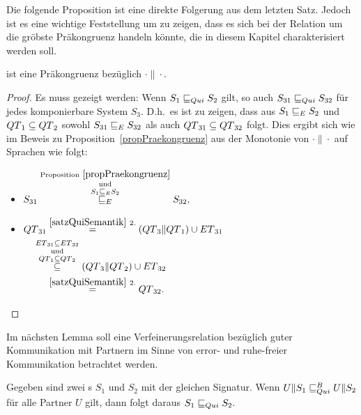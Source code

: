 Die folgende Proposition ist eine direkte Folgerung aus dem letzten Satz.
Jedoch ist es eine wichtige Feststellung um zu zeigen, dass es sich bei der
Relation \QRel{} um die gröbste Präkongruenz handeln könnte, die in diesem
Kapitel charakterisiert werden soll.

\begin{prop}
\label{propQuiPrae}
  \QRel{} ist eine Präkongruenz bezüglich $\cdot\|\cdot$.
\end{prop}

\begin{proof}
  Es muss gezeigt werden: Wenn $S_1\sqsubseteq _{Qui} S_2$ gilt, so auch
  $S_{31}\sqsubseteq _{Qui} S_{32}$ für jedes komponierbare System $S_3$. D.h.\ es ist zu zeigen, dass aus
  $S_1\sqsubseteq _E S_2$ und $QT{}_1\subseteq QT{}_2$ sowohl $S_{31}\sqsubseteq _E S_{32}$ als
  auch $QT{}_{31}\subseteq QT{}_{32}$ folgt. Dies ergibt sich wie im Beweis
  zu Proposition~\ref{propPraekongruenz} aus der Monotonie von $\cdot\|\cdot$
  auf Sprachen wie folgt:
  \begin{itemize}
    \item $\begin{aligned}[t]
        S_{31} \overset{\mathrm{Proposition}
        ~\ref{propPraekongruenz}}{\overset{\mathrm{und}}{\overset{S_1\sqsubseteq _E
    S_2}{\sqsubseteq _E}}} S_{32},
    \end{aligned}$
    \item $\begin{aligned}[t]
        \QT{}_{31} &\overset{\ref{satzQuiSemantik}~2.}{=}
        (\QT{}_3\|\QT{}_1)\cup \ET{}_{31}\\
        &\hspace{-0.5cm}\overset{\ET{}_{31}\subseteq
      \ET{}_{32}}{\overset{\mathrm{und}}{\overset{\QT{}_1\subseteq
      \QT{}_2}{\subseteq}}} (\QT{}_3\|\QT{}_2) \cup \ET{}_{32}\\
        &\overset{\ref{satzQuiSemantik}~2.}{=} \QT{}_{32}.
    \end{aligned}$
  \end{itemize}
\end{proof}

Im nächsten Lemma soll eine Verfeinerungsrelation bezüglich guter Kommunikation
mit Partnern im Sinne von error- und ruhe-freier Kommunikation betrachtet
werden.

\begin{lem}
\label{lemQuiVerfeinerung}
  Gegeben sind zwei \EIO{}s $S_1$ und $S_2$ mit der gleichen Signatur. Wenn
  $U\|S_1\sqsubseteq _{Qui}^B U\|S_2$ für alle Partner $U$ gilt, dann folgt daraus $S_1\sqsubseteq _{Qui}
  S_2$.
\end{lem}

